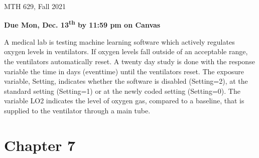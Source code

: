 \documentclass[12pt]{article}
\begin{document}
{
            \hfill {MTH 629, Fall 2021}}
\bigskip

{\bf Due Mon, Dec. 13\textsuperscript{th} by 11:59 pm on Canvas}

A medical lab is testing machine learning software which actively regulates oxygen levels in ventilators. If oxygen levels fall outside of an acceptable range, the ventilators automatically reset. A twenty day study is done with the response variable the time in days (eventtime) until the ventilators reset. The exposure variable, Setting, indicates whether the software is disabled (Setting=2), at the standard setting (Setting=1) or at the newly coded setting (Setting=0). The variable LO2 indicates the level of oxygen gas, compared to a baseline, that is supplied to the ventilator through a main tube. 

\section{Chapter 7}
\end{document}
